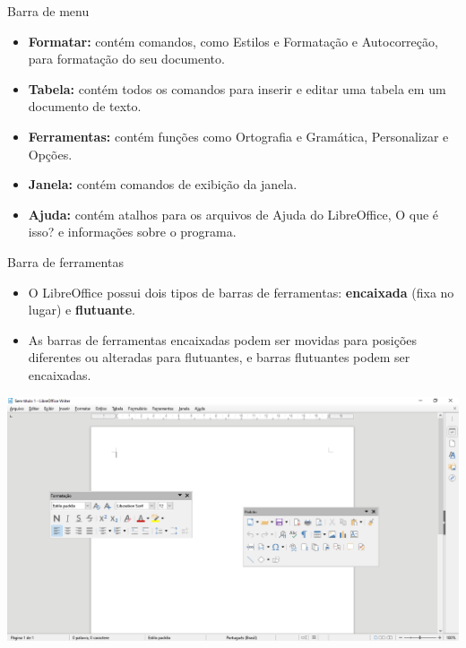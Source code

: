 \begin{frame}{Barra de menu}
	\begin{block}{}
		\begin{itemize}
			\item \textbf{Formatar:} contém comandos, como Estilos e Formatação e Autocorreção, para formatação do seu documento.
			\item \textbf{Tabela:} contém todos os comandos para inserir e editar uma tabela em um documento de texto.
			\item \textbf{Ferramentas:} contém funções como Ortografia e Gramática, Personalizar e Opções.
			\item \textbf{Janela:} contém comandos de exibição da janela.
			\item \textbf{Ajuda:} contém atalhos para os arquivos de Ajuda do LibreOffice, O que é isso? e informações sobre o programa.
		\end{itemize}
	\end{block}
\end{frame}


\begin{frame}{Barra de ferramentas}
	\begin{block}{}
		\begin{itemize}
			\item O LibreOffice possui dois tipos de barras de ferramentas: \textbf{encaixada} (fixa no lugar) e \textbf{flutuante}.
			\item As barras de ferramentas encaixadas podem ser movidas para posições diferentes ou alteradas para flutuantes, e barras flutuantes podem ser encaixadas.
		\end{itemize}
	\end{block}

	\centering
	\includegraphics[width=0.75\linewidth]{Figuras/Ch04/fig7}

\end{frame}


